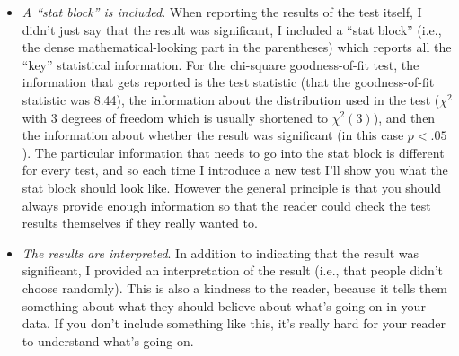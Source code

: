 \begin{itemize}
\item {\it A ``stat block'' is included}. When reporting the results of the test itself, I didn't just say that the result was significant, I included a ``stat block'' (i.e., the dense mathematical-looking part in the parentheses) which reports all the ``key'' statistical information. For the chi-square goodness-of-fit test, the information that gets reported is the test statistic (that the goodness-of-fit statistic was 8.44), the information about the distribution used in the test ($\chi^2$ with 3 degrees of freedom which is usually shortened to $\chi^2(3)$), and then the information about whether the result was significant (in this case $p<.05$). The particular information that needs to go into the stat block is different for every test, and so each time I introduce a new test I'll show you what the stat block should look like. However the general principle is that you should always provide enough information so that the reader could check the test results themselves if they really wanted to. 
\item {\it The results are interpreted}. In addition to indicating that the result was significant, I provided an interpretation of the result (i.e., that people didn't choose randomly). This is also a kindness to the reader, because it tells them something about what they should believe about what's going on in your data. If you don't include something like this, it's really hard for your reader to understand what's going on.
\end{itemize}
